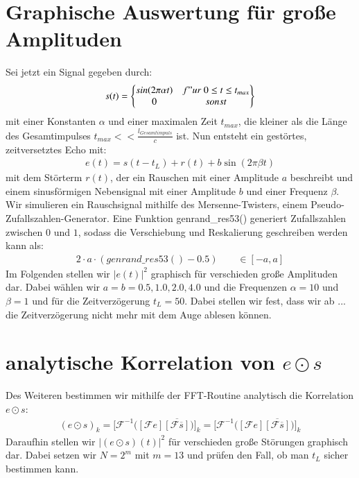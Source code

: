 \documentclass[ngerman]{scrartcl}
\begin{document}
\section{Graphische Auswertung für große Amplituden}
Sei jetzt ein Signal gegeben durch:
\begin{align}
s(t)=\left\{\begin{matrix}sin(2\pi \alpha t) & f"ur \ 0\leq t\leq t_{max}\\ 0 & sonst \end{matrix}\right\}
\end{align}
mit einer Konstanten $\alpha$ und einer maximalen Zeit $t_{max}$, die kleiner als die Länge des Gesamtimpulses $t_{max}<<\frac{l_{Gesamtimpuls}}{c}$ ist. Nun entsteht ein gestörtes, zeitversetztes Echo mit:
\begin{align}
	e(t)=s(t-t_L)+r(t)+b \sin(2\pi \beta t)
\end{align}
mit dem Störterm $r(t)$, der ein Rauschen mit einer Amplitude $a$ beschreibt und einem sinusförmigen Nebensignal mit einer Amplitude $b$ und einer Frequenz $\beta$. 
Wir simulieren ein Rauschsignal mithilfe des Mersenne-Twisters, einem Pseudo-Zufallszahlen-Generator. Eine Funktion genrand\_res53() generiert Zufallszahlen zwischen $0$ und $1$, sodass die Verschiebung und Reskalierung geschreiben werden kann als: 
\begin{align}
	2 \cdot a \cdot (genrand\_res53()-0.5) \qquad \in [-a,a]
\end{align}
Im Folgenden stellen wir $|e(t)|^2$ graphisch für verschieden große Amplituden dar. Dabei wählen wir $a=b=0.5,1.0,2.0,4.0$ und die Frequenzen $\alpha=10$ und $\beta=1$ und für die Zeitverzögerung $t_L=50$. Dabei stellen wir fest, dass wir ab ... die Zeitverzögerung nicht mehr mit dem Auge ablesen können.
\section{analytische Korrelation von $e \odot s$}
Des Weiteren bestimmen wir mithilfe der FFT-Routine analytisch die Korrelation $e \odot s$:
\begin{align}
(e \odot s)_k=\biggl[ \mathcal{F}^{-1}\biggl( [\mathcal{F}e]\overline{[\mathcal{F}\overline{s}]}\biggr)\biggr]_k=\biggl[\mathcal{F}^{-1}\biggl([\mathcal{F}e]\overline{[\mathcal{F}\overline{s}]}\biggr)\biggr]_k
\end{align}
Daraufhin stellen wir $|(e \odot s)(t)|^2$ für verschieden große Störungen graphisch dar. Dabei setzen wir $N=2^m$ mit $m=13$ und prüfen den Fall, ob man $t_L$ sicher bestimmen kann. 
\end{document}
